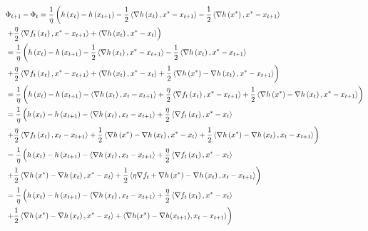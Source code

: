 \begin{align}
&\Phi_{t+1}-\Phi_t=  \frac{1}{\eta}\left(h\left(x_t\right)-h\left(x_{t+1}\right)-\frac{1}{2}\left\langle\nabla h\left(x_t\right), x^*-x_{t+1}\right\rangle-\frac{1}{2}\left\langle\nabla h\left(x^*\right), x^*-x_{t+1}\right\rangle\right. \\
& \left.+\frac{\eta}{2}\left\langle\nabla f_t\left(x_t\right), x^*-x_{t+1}\right\rangle+\left\langle\nabla h\left(x_t\right), x^*-x_t\right\rangle\right)
\\
&= \frac{1}{\eta}\left(h\left(x_t\right)-h\left(x_{t+1}\right)-\frac{1}{2}\left\langle\nabla h\left(x_t\right), x^*-x_{t+1}\right\rangle-\frac{1}{2}\left\langle\nabla h\left(x_{t}\right), x^*-x_{t+1}\right\rangle\right. \\
& \left.+\frac{\eta}{2}\left\langle\nabla f_t\left(x_t\right), x^*-x_{t+1}\right\rangle+\left\langle\nabla h\left(x_t\right), x^*-x_t\right\rangle+ \frac{1}{2  } \left\langle\nabla h\left(x^*\right)-\nabla h\left(x_t\right), x^*-x_{t+1}\right\rangle\right) 
\\
&= \frac{1}{\eta}\left(h\left(x_t\right)-h\left(x_{t+1}\right)-\left\langle\nabla h\left(x_t\right), x_t-x_{t+1}\right\rangle+\frac{\eta}{2}\left\langle\nabla f_t\left(x_t\right), x^*-x_{t+1}\right\rangle+ \frac{1}{2  } \left\langle\nabla h\left(x^*\right)-\nabla h\left(x_t\right), x^*-x_{t+1}\right\rangle\right) 
\\
&= \frac{1}{\eta}\left(h\left(x_t\right)-h\left(x_{t+1}\right)-\left\langle\nabla h\left(x_t\right), x_t-x_{t+1}\right\rangle + \frac{\eta}{2}\left\langle\nabla f_t\left(x_t\right), x^*-x_{t}\right\rangle\right. \\
& \left.+\frac{\eta}{2}\left\langle\nabla f_t\left(x_t\right), x_t-x_{t+1}\right\rangle+ \frac{1}{2  } \left\langle\nabla h\left(x^*\right)-\nabla h\left(x_t\right), x^*-x_{t}\right\rangle+\frac{1}{2  } \left\langle\nabla h\left(x^*\right)-\nabla h\left(x_t\right), x_t-x_{t+1}\right\rangle\right) \notag
\\
&= \frac{1}{\eta}\left(h\left(x_t\right)-h\left(x_{t+1}\right)-\left\langle\nabla h\left(x_t\right), x_t-x_{t+1}\right\rangle + \frac{\eta}{2}\left\langle\nabla f_t\left(x_t\right), x^*-x_{t}\right\rangle\right. \\
& \left.+ \frac{1}{2  } \left\langle\nabla h\left(x^*\right)-\nabla h\left(x_t\right), x^*-x_{t}\right\rangle+\frac{1}{2  } \left\langle \eta \nabla f_t + \nabla h\left(x^*\right)-\nabla h\left(x_t\right), x_t-x_{t+1}\right\rangle\right) 
\\
&= \frac{1}{\eta}\left(h\left(x_t\right)-h\left(x_{t+1}\right)-\left\langle\nabla h\left(x_t\right), x_t-x_{t+1}\right\rangle + \frac{\eta}{2}\left\langle\nabla f_t\left(x_t\right), x^*-x_{t}\right\rangle\right. \\
& \left.+\frac{1}{2  } \left\langle\nabla h\left(x^*\right)-\nabla h\left(x_t\right), x^*-x_{t}\right\rangle+\left\langle \nabla h(x^*)-\nabla h(x_{t+1}), x_t-x_{t+1}\right\rangle\right) \notag 
\end{align}

